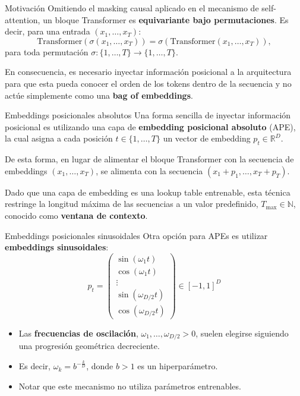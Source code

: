 \documentclass{beamer}
\newcommand{\R}{\mathbb{R}}
\newcommand{\N}{\mathbb{N}}
\begin{document}
\begin{frame}{Motivación}
    Omitiendo el masking causal aplicado en el mecanismo de self-attention, un bloque Transformer es \textbf{equivariante bajo permutaciones}. Es decir, para una entrada $(x_1,\ldots,x_T)$:
    \begin{equation*}
        \text{Transformer}(\sigma(x_1,\ldots,x_T)) = \sigma(\text{Transformer}(x_1,\ldots,x_T)),
    \end{equation*}
    para toda permutación $\sigma:\{1,\ldots,T\}\to\{1,\ldots,T\}$.

    En consecuencia, es necesario inyectar información posicional a la arquitectura para que esta pueda conocer el orden de los tokens dentro de la secuencia y no actúe simplemente como una \textbf{bag of embeddings}.
\end{frame}

\begin{frame}{Embeddings posicionales absolutos}
    Una forma sencilla de inyectar información posicional es utilizando una capa de \textbf{embedding posicional absoluto} (APE), la cual asigna a cada posición $t\in\{1,\ldots,T\}$ un vector de embedding $p_t\in\R^D$.

    De esta forma, en lugar de alimentar el bloque Transformer con la secuencia de embeddings $(x_1,\ldots,x_T)$, se alimenta con la secuencia $(x_1+p_1,\ldots,x_T+p_T)$.

    Dado que una capa de embedding es una lookup table entrenable, esta técnica restringe la longitud máxima de las secuencias a un valor predefinido, $T_{\max}\in\N$, conocido como \textbf{ventana de contexto}.
\end{frame}

\begin{frame}{Embeddings posicionales sinusoidales}
    Otra opción para APEs es utilizar \textbf{embeddings sinusoidales}:
    \begin{equation*}
        p_t=
        \left(
        \begin{matrix}
                \sin(\omega_1 t) \\ \cos(\omega_1 t)\\ \vdots \\ \sin(\omega_{D/2} t)\\ \cos(\omega_{D/2} t)
            \end{matrix}
        \right)\in[-1,1]^D
    \end{equation*}
    \vspace{-0.5cm}
    \begin{itemize}
        \item Las \textbf{frecuencias de oscilación}, $\omega_1,\ldots,\omega_{D/2}>0$, suelen elegirse siguiendo una progresión geométrica decreciente.
        \item Es decir, $\omega_k = b^{-\frac{k}{D}}$, donde $b>1$ es un hiperparámetro.
        \item Notar que este mecanismo no utiliza parámetros entrenables.
    \end{itemize}
\end{frame}
\end{document}
